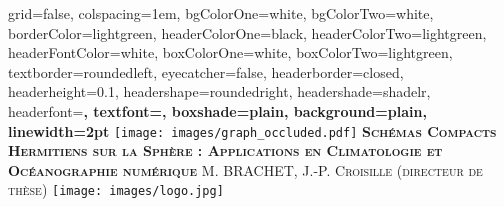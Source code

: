 \documentclass[portrait,final,a0paper,fontscale=0.277]{baposter}
\begin{document}



\begin{poster}%
  {
  grid=false,
  colspacing=1em,
  bgColorOne=white,
  bgColorTwo=white,
  borderColor=lightgreen,
  headerColorOne=black,
  headerColorTwo=lightgreen,
  headerFontColor=white,
  boxColorOne=white,
  boxColorTwo=lightgreen,
  textborder=roundedleft,
  eyecatcher=false,
  headerborder=closed,
  headerheight=0.1\textheight,
  headershape=roundedright,
  headershade=shadelr,
  headerfont=\Large\bf\textsc, %
  textfont={\setlength{\parindent}{1.5em}},
  boxshade=plain,
  background=plain,
  linewidth=2pt
  }
  {\texttt{[image: images/graph\_occluded.pdf]}} 
  {\bf\textsc{Schémas Compacts Hermitiens sur la Sphère : Applications en Climatologie et Océanographie numérique}\vspace{0.4em}}
  {\textsc{ M. BRACHET, J.-P. Croisille (directeur de thèse)}}
  {%
    \texttt{[image: images/logo.jpg]}
  }

    \newcommand{\colouredcircle}{%
      \tikz{\useasboundingbox (-0.2em,-0.32em) rectangle(0.2em,0.32em); \draw[draw=black,fill=lightblue,line width=0.03em] (0,0) circle(0.18em);}}


\end{poster}
\end{document}
